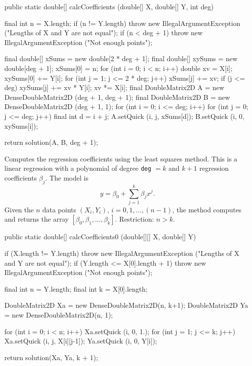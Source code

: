 \begin{code}

   public static double[] calcCoefficients (double[] X, double[] Y, int deg) \begin{hide} {
      final int n = X.length;
      if (n != Y.length)
         throw new IllegalArgumentException ("Lengths of X and Y are not equal");
      if (n < deg + 1)
         throw new IllegalArgumentException ("Not enough points");

      final double[] xSums = new double[2 * deg + 1];
      final double[] xySums = new double[deg + 1];
      xSums[0] = n;
      for (int i = 0; i < n; i++) {
         double xv = X[i];
         xySums[0] += Y[i];
         for (int j = 1; j <= 2 * deg; j++) {
            xSums[j] += xv;
            if (j <= deg)
               xySums[j] += xv * Y[i];
            xv *= X[i];
         }
      }
      final DoubleMatrix2D A = new DenseDoubleMatrix2D (deg + 1, deg + 1);
      final DoubleMatrix2D B = new DenseDoubleMatrix2D (deg + 1, 1);
      for (int i = 0; i <= deg; i++) {
         for (int j = 0; j <= deg; j++) {
            final int d = i + j;
            A.setQuick (i, j, xSums[d]);
         }
         B.setQuick (i, 0, xySums[i]);
      }

      return solution(A, B, deg + 1);
   }\end{hide}
\end{code}
\begin{tabb} Computes the regression coefficients using the
least squares method. This is a linear regression with a polynomial of
degree \texttt{deg} $= k$ and $k+1$ regression coefficients $\beta_j$.
The model is
\[
   y = \beta_0 + \sum_{j=1}^k \beta_j x^j.
\]
Given the $n$ data points $(X_i, Y_i)$, $i=0,1,\ldots,(n-1)$,
 the method computes and returns the array
$[\beta_0, \beta_1, \ldots, \beta_k]$. Restriction: $n > k$.
\end{tabb}
\begin{htmlonly}
\end{htmlonly}
\begin{code}

   public static double[] calcCoefficients0 (double[][] X, double[] Y)\begin{hide} {
      if (X.length != Y.length)
         throw new IllegalArgumentException ("Lengths of X and Y are not equal");
      if (Y.length <= X[0].length + 1)
         throw new IllegalArgumentException ("Not enough points");

      final int n = Y.length;
      final int k = X[0].length;

      DoubleMatrix2D Xa = new DenseDoubleMatrix2D(n, k+1);
      DoubleMatrix2D Ya = new DenseDoubleMatrix2D(n, 1);

      for (int i = 0; i < n; i++) {
         Xa.setQuick (i, 0, 1.);
         for (int j = 1; j <= k; j++) {
            Xa.setQuick (i, j, X[i][j-1]);
         }
         Ya.setQuick (i, 0, Y[i]);
      }

      return solution(Xa, Ya, k + 1);
   }\end{hide}
\end{code}

